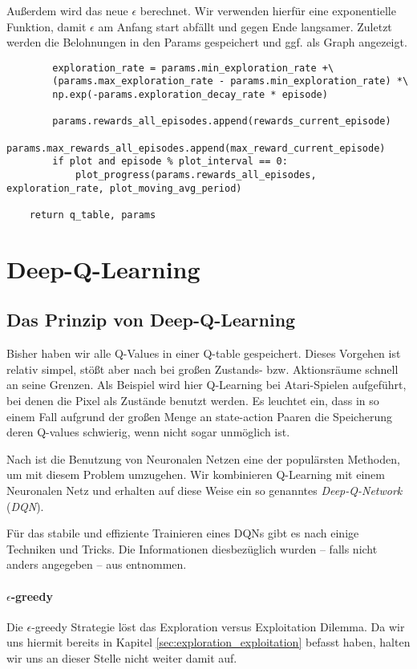 Außerdem wird das neue $ \epsilon $ berechnet. Wir verwenden hierfür eine exponentielle Funktion, damit $ \epsilon $ am Anfang start abfällt und gegen Ende langsamer. Zuletzt werden die Belohnungen in den Params gespeichert und ggf. als Graph angezeigt.
\begin{verbatim}
        exploration_rate = params.min_exploration_rate +\
        (params.max_exploration_rate - params.min_exploration_rate) *\
        np.exp(-params.exploration_decay_rate * episode)

        params.rewards_all_episodes.append(rewards_current_episode)
        params.max_rewards_all_episodes.append(max_reward_current_episode)
        if plot and episode % plot_interval == 0:
            plot_progress(params.rewards_all_episodes, exploration_rate, plot_moving_avg_period)

    return q_table, params
\end{verbatim}


\section{Deep-Q-Learning}
\subsection{Das Prinzip von Deep-Q-Learning} \label{sec:deepQPrinciple}
Bisher haben wir alle Q-Values in einer Q-table gespeichert. Dieses Vorgehen ist relativ simpel, stößt aber nach \cite{11_maxim2018deeprl} bei großen Zustands- bzw. Aktionsräume schnell an seine Grenzen. Als Beispiel wird hier Q-Learning bei Atari-Spielen aufgeführt, bei denen die Pixel als Zustände benutzt werden. Es leuchtet ein, dass in so einem Fall aufgrund der großen Menge an state-action Paaren die Speicherung deren Q-values schwierig, wenn nicht sogar unmöglich ist.

Nach \cite{11_maxim2018deeprl} ist die Benutzung von Neuronalen Netzen eine der populärsten Methoden, um mit diesem Problem umzugehen. Wir kombinieren Q-Learning mit einem Neuronalen Netz und erhalten auf diese Weise ein so genanntes \textit{Deep-Q-Network} (\textit{DQN}).

Für das stabile und effiziente Trainieren eines DQNs gibt es nach \cite{11_maxim2018deeprl} einige Techniken und Tricks. Die Informationen diesbezüglich wurden -- falls nicht anders angegeben -- aus \cite{11_maxim2018deeprl} entnommen.

\paragraph{$ \epsilon $-greedy}
Die $ \epsilon $-greedy Strategie löst das Exploration versus Exploitation Dilemma. Da wir uns hiermit bereits in Kapitel \ref{sec:exploration_exploitation} befasst haben, halten wir uns an dieser Stelle nicht weiter damit auf.

